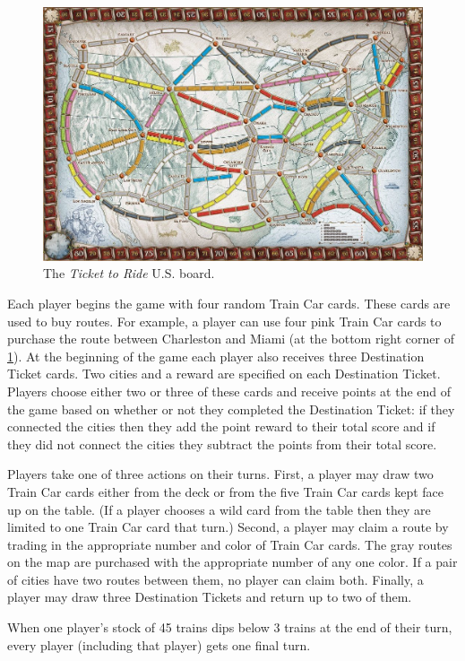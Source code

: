 \begin{figure}[ht]
\centering
\includegraphics[scale=.2]{figures/board}
\caption{The \textit{Ticket to Ride} U.S. board.}
\label{fig:board}
\end{figure}

Each player begins the game with four random Train Car cards.
These cards are used to buy routes.
For example, a player can use four pink Train Car cards to purchase
the route between Charleston and Miami
(at the bottom right corner of \cref{fig:board}).
At the beginning of the game 
each player also receives three Destination Ticket cards.
Two cities and a reward are specified on each Destination Ticket.
Players choose either two or three of these cards and
receive points at the end of the game based on whether
or not they completed the Destination Ticket:
if they connected the cities then they add the point reward to their
total score and
if they did not connect the cities they subtract the points from their
total score.

Players take one of three actions on their turns.
First, a player may draw two Train Car cards either
from the deck or from the five Train Car cards
kept face up on the table. 
(If a player chooses a wild card from the table
then they are limited to one Train Car card that turn.)
Second, a player may claim a route by trading in
the appropriate number and color of Train Car cards.
The gray routes on the map are purchased with
the appropriate number of any one color.
If a pair of cities have two routes between them,
no player can claim both.
Finally, a player may draw three Destination Tickets
and return up to two of them.

When one player's stock of 45 trains dips below 3 trains at the end of their turn,
every player (including that player) gets one final turn.
